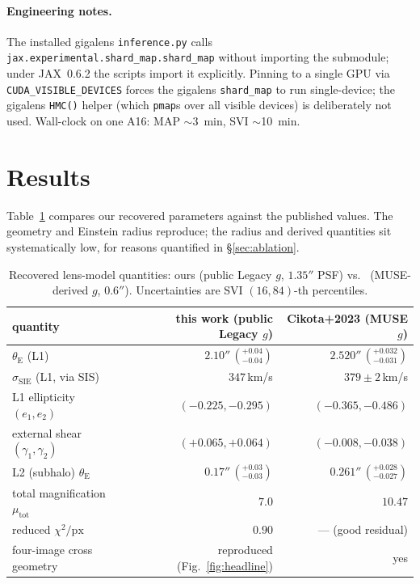 \documentclass[11pt,letterpaper]{article}
\newcommand{\thetaE}{\ensuremath{\theta_{\mathrm{E}}}}
\newcommand{\sigmaSIE}{\ensuremath{\sigma_{\mathrm{SIE}}}}
\renewcommand{\arcsec}{\ensuremath{''}}
\begin{document}
\paragraph{Engineering notes.} The installed gigalens \texttt{inference.py}
calls \texttt{jax.experimental.shard\_map.shard\_map} without importing
the submodule; under JAX~0.6.2 the scripts import it explicitly. Pinning
to a single GPU via \texttt{CUDA\_VISIBLE\_DEVICES} forces the gigalens
\texttt{shard\_map} to run single-device; the gigalens \texttt{HMC()}
helper (which \texttt{pmap}s over all visible devices) is deliberately not
used. Wall-clock on one A16: MAP $\sim$3~min, SVI $\sim$10~min.

\section{Results}

Table~\ref{tab:headline} compares our recovered parameters against the
published values. The geometry and Einstein radius reproduce; the radius
and derived quantities sit systematically low, for reasons quantified in
\S\ref{sec:ablation}.

\begin{table}[ht]
\centering
\caption{Recovered lens-model quantities: ours (public Legacy $g$,
$1.35\arcsec$ PSF) vs.\ \citet{cikota2023einstein} (MUSE-derived $g$,
$0.6\arcsec$). Uncertainties are SVI $(16,84)$-th percentiles.}
\label{tab:headline}
\begin{tabular}{lrr}
\toprule
quantity                          & this work (public Legacy $g$) & Cikota+2023 (MUSE $g$) \\
\midrule
$\thetaE$ (L1)                    & $2.10\arcsec\,(^{+0.04}_{-0.04})$ & $2.520\arcsec\,(^{+0.032}_{-0.031})$ \\
$\sigmaSIE$ (L1, via SIS)         & $347\,$km/s                        & $379\pm2\,$km/s \\
L1 ellipticity $(e_1, e_2)$       & $(-0.225, -0.295)$                 & $(-0.365, -0.486)$ \\
external shear $(\gamma_1, \gamma_2)$ & $(+0.065, +0.064)$             & $(-0.008, -0.038)$ \\
L2 (subhalo) $\thetaE$            & $0.17\arcsec\,(^{+0.03}_{-0.03})$  & $0.261\arcsec\,(^{+0.028}_{-0.027})$ \\
total magnification $\mu_{\mathrm{tot}}$ & $7.0$                       & $10.47$ \\
reduced $\chi^2/\mathrm{px}$      & $0.90$                             & --- (good residual) \\
four-image cross geometry         & reproduced (Fig.~\ref{fig:headline}) & yes \\
\bottomrule
\end{tabular}
\end{table}
\end{document}
